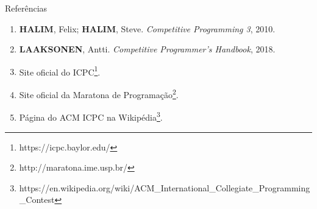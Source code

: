 \begin{frame}[fragile]{Referências}

    \begin{enumerate}
        \item \textbf{HALIM}, Felix; \textbf{HALIM}, Steve. \textit{Competitive Programming 3}, 2010.
        \item \textbf{LAAKSONEN}, Antti. \textit{Competitive Programmer's Handbook}, 2018.

        \item Site oficial do ICPC\footnote{https://icpc.baylor.edu/}.

        \item Site oficial da Maratona de Programação\footnote{http://maratona.ime.usp.br/}.

        \item Página do ACM ICPC na Wikipédia\footnote{https://en.wikipedia.org/wiki/ACM\_International\_Collegiate\_Programming\_Contest}.
    \end{enumerate}

\end{frame}
